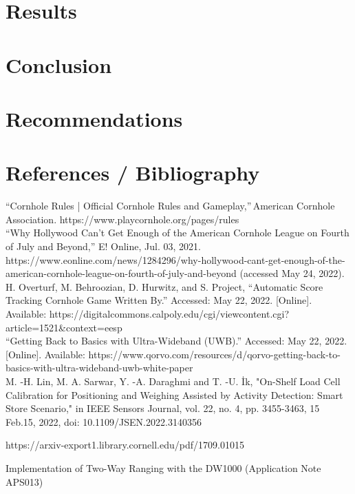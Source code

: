 \documentclass{article}
\begin{document}
\section{Results}

 
\section{Conclusion}
\section{Recommendations}
\section{References / Bibliography}

\hspace{10pt} “Cornhole Rules | Official Cornhole Rules and Gameplay,” American Cornhole Association. https://www.playcornhole.org/pages/rules \\

“Why Hollywood Can’t Get Enough of the American Cornhole League on Fourth of July and Beyond,” E! Online, Jul. 03, 2021. https://www.eonline.com/news/1284296/why-hollywood-cant-get-enough-of-the-american-cornhole-league-on-fourth-of-july-and-beyond (accessed May 24, 2022). \\

H. Overturf, M. Behroozian, D. Hurwitz, and S. Project, “Automatic Score Tracking Cornhole Game Written By.” Accessed: May 22, 2022. [Online]. Available: https://digitalcommons.calpoly.edu/cgi/viewcontent.cgi?article=1521\&context=eesp \\

“Getting Back to Basics with Ultra-Wideband (UWB).” Accessed: May 22, 2022. [Online]. Available: https://www.qorvo.com/resources/d/qorvo-getting-back-to-basics-with-ultra-wideband-uwb-white-paper \\

M. -H. Lin, M. A. Sarwar, Y. -A. Daraghmi and T. -U. İk, "On-Shelf Load Cell Calibration for Positioning and Weighing Assisted by Activity Detection: Smart Store Scenario," in IEEE Sensors Journal, vol. 22, no. 4, pp. 3455-3463, 15 Feb.15, 2022, doi: 10.1109/JSEN.2022.3140356 

https://arxiv-export1.library.cornell.edu/pdf/1709.01015

Implementation of Two-Way Ranging with the DW1000 (Application Note APS013)
\end{document}
